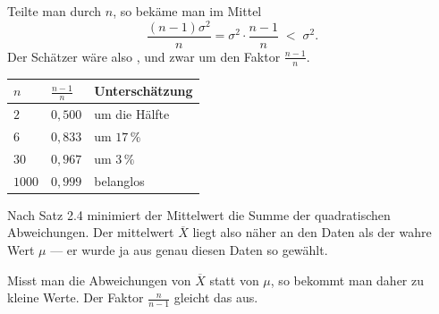 \begin{merksatz}
\begin{center}
\begin{minipage}{0.9\textwidth}
Teilte man durch $n$, so bekäme man im Mittel
\[ \frac{(n-1)\sigma^2}{n} = \sigma^2 \cdot \frac{n-1}{n} \;<\; \sigma^2 . \]
Der Schätzer wäre also , und zwar um den Faktor $\frac{n-1}{n}$.
\end{minipage}
\end{center}

\begin{center}
\renewcommand{\arraystretch}{1.45}
\begin{tabular}{@{}P{1.6cm}P{2.4cm}P{3.0cm}@{}}
\toprule
$n$ & $\frac{n-1}{n}$ & \textbf{Unterschätzung}\\
\midrule
$2$ & $0{,}500$ & \textcolor{akzent}{um die Hälfte}\\
$6$ & $0{,}833$ & um $17\,\%$\\
$30$ & $0{,}967$ & um $3\,\%$\\
$1000$ & $0{,}999$ & belanglos\\
\bottomrule
\end{tabular}
\end{center}

Nach Satz 2.4 minimiert der Mittelwert die Summe der quadratischen Abweichungen. Der mittelwert $\overline X$ liegt also näher an den Daten als der wahre Wert $\mu$ --- er wurde ja aus genau diesen Daten so gewählt.

Misst man die Abweichungen von $\overline X$ statt von $\mu$, so bekommt man daher zu kleine Werte. Der Faktor $\frac{n}{n-1}$ gleicht das aus.

\begin{center}
\begin{minipage}{0.88\textwidth}
\end{minipage}
\end{center}
\end{merksatz}

